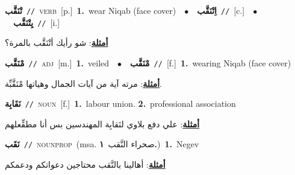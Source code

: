 \documentclass[10pt,a4paper,twoside]{article} %
\begin{document}
\begin{multicols}{2}
{\setlength\topsep{0pt}\textbf{\foreignlanguage{arabic}{تْنَقَّب}}\ {\color{gray}\texttt{//}\color{black}}\ \textsc{verb}\ [p.]\ \textbf{1.}~wear Niqab (face cover)\ \ $\bullet$\ \ \setlength\topsep{0pt}\textbf{\foreignlanguage{arabic}{اِتْنَقَّب}}\ {\color{gray}\texttt{//}\color{black}}\ [c.]\ \ $\bullet$\ \ \setlength\topsep{0pt}\textbf{\foreignlanguage{arabic}{يِتْنَقَّب}}\ {\color{gray}\texttt{//}\color{black}}\ [i.]\  \begin{flushright}\color{gray}\foreignlanguage{arabic}{\textbf{\underline{\foreignlanguage{arabic}{أمثلة}}}: شو رأيك أتْنَقَّب بالمرة؟}\end{flushright}\color{black}} \vspace{2mm}

{\setlength\topsep{0pt}\textbf{\foreignlanguage{arabic}{مْنَقَّب}}\ {\color{gray}\texttt{//}\color{black}}\ \textsc{adj}\ [m.]\ \textbf{1.}~veiled\ \ $\bullet$\ \ \setlength\topsep{0pt}\textbf{\foreignlanguage{arabic}{مْنَقَّب}}\ {\color{gray}\texttt{//}\color{black}}\ [f.]\ \textbf{1.}~wearing Niqab (face cover)\  \begin{flushright}\color{gray}\foreignlanguage{arabic}{\textbf{\underline{\foreignlanguage{arabic}{أمثلة}}}: مرته آية من آيات الجمال وهياتها مْنَقَّبِّة.}\end{flushright}\color{black}} \vspace{2mm}

{\setlength\topsep{0pt}\textbf{\foreignlanguage{arabic}{نَقَابِة}}\ {\color{gray}\texttt{//}\color{black}}\ \textsc{noun}\ [f.]\ \textbf{1.}~labour union.  \textbf{2.}~professional association\  \begin{flushright}\color{gray}\foreignlanguage{arabic}{\textbf{\underline{\foreignlanguage{arabic}{أمثلة}}}: علي دفع بلاوي لنَقابِة المهندسين بس أنا مطقِّعلهم}\end{flushright}\color{black}} \vspace{2mm}

{\setlength\topsep{0pt}\textbf{\foreignlanguage{arabic}{نَقَب}}\ {\color{gray}\texttt{//}\color{black}}\ \textsc{noun\textunderscore prop}\ \color{gray}(msa. \foreignlanguage{arabic}{صحراء النَّقب}~\foreignlanguage{arabic}{\textbf{١.}})\color{black}\ \textbf{1.}~Negev\  \begin{flushright}\color{gray}\foreignlanguage{arabic}{\textbf{\underline{\foreignlanguage{arabic}{أمثلة}}}: أهالينا بالنَّقب محتاجين دعواتكم ودعمكم}\end{flushright}\color{black}} \vspace{2mm}


\end{multicols}
\end{document}
